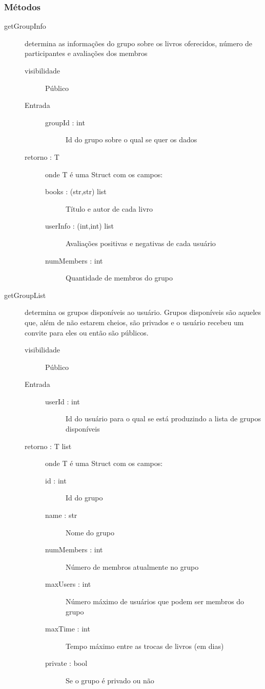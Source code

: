\documentclass[a4paper]{article}
\begin{document}
	\subsubsection{Métodos}
		\begin{description} %
		 \item [getGroupInfo] determina as informações do grupo sobre os livros oferecidos, número de participantes e avaliações dos membros
			\begin{description} %
			 \item [visibilidade] Público
			 \item [Entrada] \mbox{}
				\begin{description} %
				 \item [groupId : int] Id do grupo sobre o qual se quer os dados
				\end{description} %
				
			 \item [retorno : T] onde T é uma Struct com os campos:
				\begin{description} %
				 \item [books : (str,str) list] Título e autor de cada livro
				 \item [userInfo : (int,int) list] Avaliações positivas e negativas de cada usuário
				 \item [numMembers : int] Quantidade de membros do grupo
				\end{description} %
				
			\end{description} %
			
			\item [getGroupList] determina os grupos disponíveis ao usuário. Grupos disponíveis são aqueles que, além de não estarem cheios, são privados e o usuário recebeu um convite para eles ou então são públicos. 
			\begin{description}
			 \item [visibilidade] Público
			 \item [Entrada] \mbox{}
				\begin{description}
				 \item [userId : int] Id do usuário para o qual se está produzindo a lista de grupos disponíveis
				\end{description}
				
			 \item [retorno : T list] onde T é uma Struct com os campos:
			 \begin{description}
			  \item [id : int] Id do grupo
			  \item [name : str] Nome do grupo
			  \item [numMembers : int] Número de membros atualmente no grupo
			  \item [maxUsers : int] Número máximo de usuários que podem ser membros do grupo
			  \item [maxTime : int] Tempo máximo entre as trocas de livros (em dias)
			  \item [private : bool] Se o grupo é privado ou não
			 \end{description}


\end{description}
\end{description}
\end{document}
